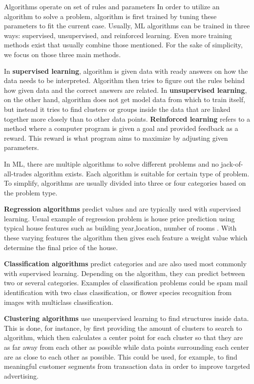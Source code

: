 Algorithms operate on set of rules and parameters
In order to utilize an algorithm to solve a problem,
algorithm is first trained by tuning these parameters
to fit the current case.
Usually,
ML algorithms can be trained in three ways:
supervised, unsupervised, and reinforced learning.\cite{jordan2015machine}
Even more training methods exist
that usually combine those mentioned.\cite{ayodele2010types, mahesh2020machine}
For the sake of simplicity,
we focus on those three main methods.

In \textbf{supervised learning},
algorithm is given data with ready answers on
how the data needs to be interpreted.
Algorithm then tries to figure out the rules behind
how given data and the correct answers are related.\cite{ayodele2010types}
In \textbf{unsupervised learning},
on the other hand,
algorithm does not get model data from which to train itself,
but instead it tries to find clusters or groups inside the data
that are linked together more closely than to other data points.\cite{winky}
\textbf{Reinforced learning} refers to a method
where a computer program is given a goal
and provided feedback as a reward.
This reward is what program aims to maximize
by adjusting given parameters.\cite{ayodele2010types}

In ML,
there are multiple algorithms to solve different problems
and no jack-of-all-trades algorithm exists.
Each algorithm is suitable for certain type of problem.
To simplify,
algorithms are usually divided into three or four categories
based on the problem type.\cite{vickery2019mltypes}

\textbf{Regression algorithms} predict values
and are typically used with supervised learning.
Usual example of regression problem
is house price prediction
using typical house features
such as building
year,location, number of rooms \etc.
With these varying features
the algorithm then gives each feature a weight value
which determine the final price of the house.\cite{vickery2019mltypes}

\textbf{Classification algorithms} predict categories
and are also used most commonly with supervised learning.
Depending on the algorithm,
they can predict between two or several categories.
Examples of classification problems
could be spam mail identification with two class classification,
or flower species recognition from images with multiclass classification.\cite{vickery2019mltypes}

\textbf{Clustering algorithms} use unsupervised learning
to find structures inside data.
This is done,
for instance,
by first providing the amount of clusters to search to algorithm,
which then calculates a center point for each cluster
so that they are as far away from each other as possible
while data points surrounding each center are as close to each other as possible.\cite{mahesh2020machine}
This could be used,
for example,
to find meaningful customer segments from transaction data
in order to improve targeted advertising.\cite{chen2017purtreeclust}

